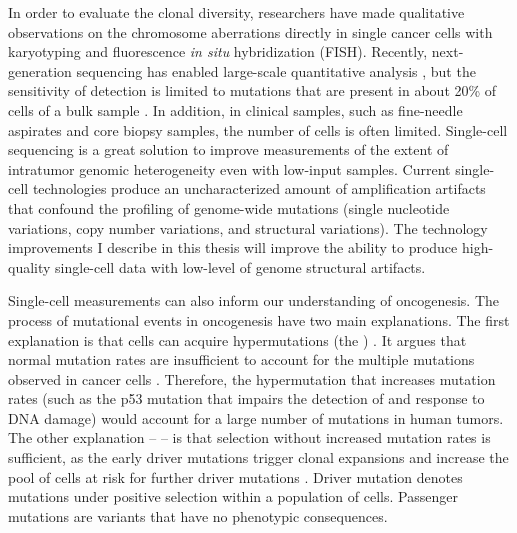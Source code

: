 In order to evaluate the clonal diversity, researchers have made qualitative observations on the chromosome aberrations directly in single cancer cells with karyotyping and fluorescence \textit{in situ} hybridization (FISH). Recently, next-generation sequencing has enabled large-scale quantitative analysis \cite{Navin:2014cm}, but the sensitivity of detection is limited to mutations that are present in about 20\% of cells of a bulk sample \cite{Gawad:2016vx}. In addition, in clinical samples, such as fine-needle aspirates and core biopsy samples, the number of cells is often limited. Single-cell sequencing is a great solution to improve measurements of the extent of intratumor genomic heterogeneity even with low-input samples. Current single-cell technologies produce an uncharacterized amount of amplification artifacts that confound the profiling of genome-wide mutations (single nucleotide variations, copy number variations, and structural variations). The technology improvements I describe in this thesis will improve the ability to produce high-quality single-cell data with low-level of genome structural artifacts. 

Single-cell measurements can also inform our understanding of oncogenesis. The process of mutational events in oncogenesis have two main explanations. The first explanation is that cells can acquire hypermutations (the ) \cite{Loeb:2003ij}. It argues that normal mutation rates are insufficient to account for the multiple mutations observed in cancer cells \cite{Loeb:1991us}. Therefore, the hypermutation that increases mutation rates (such as the p53 mutation that impairs the detection of and response to DNA damage) would account for a large number of mutations in human tumors. The other explanation --  -- is that selection without increased mutation rates is sufficient, as the early driver mutations trigger clonal expansions and increase the pool of cells at risk for further driver mutations \cite{Tomlinson:1996vw}. Driver mutation denotes mutations under positive selection within a population of cells. Passenger mutations are variants that have no phenotypic consequences. 

